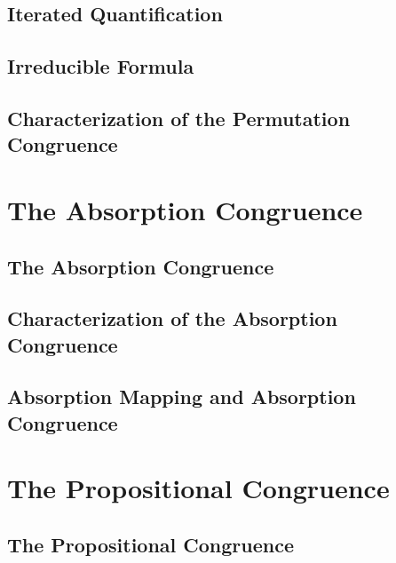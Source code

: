     \subsection{Iterated Quantification}
      
    \subsection{Irreducible Formula}
      
    \subsection{Characterization of the Permutation Congruence}
      
\section{The Absorption Congruence}
    \subsection{The Absorption Congruence}
      
    \subsection{Characterization of the Absorption Congruence}
      
    \subsection{Absorption Mapping and Absorption Congruence}
      
\section{The Propositional Congruence}
    \subsection{The Propositional Congruence}
      

